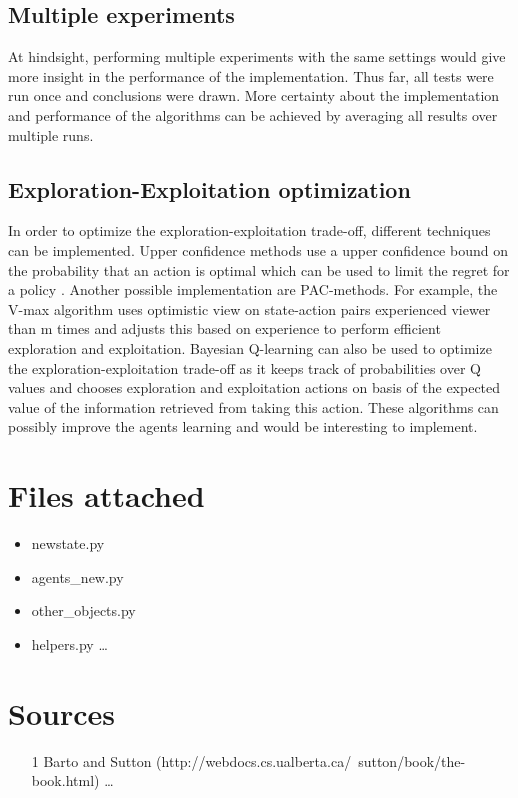 \documentclass{article}
\begin{document}
\subsection{Multiple experiments}
At hindsight, performing multiple experiments with the same settings would give more insight in the performance of the implementation. Thus far, all tests were run once and conclusions were drawn. More certainty about the implementation and performance of the algorithms can be achieved by averaging all results over multiple runs.

\subsection{Exploration-Exploitation optimization}
In order to optimize the exploration-exploitation trade-off, different techniques can be implemented. Upper confidence methods use a upper confidence bound on the probability that an action is optimal which can be used to limit the regret for a policy \cite{auer2009near}. Another possible implementation are PAC-methods. For example, the V-max\cite{rao:aamas12} algorithm uses optimistic view on state-action pairs experienced viewer than m times and adjusts this based on experience to perform efficient exploration and exploitation. Bayesian Q-learning \cite{dearden1998bayesian} can also be used to optimize the exploration-exploitation trade-off as it keeps track of probabilities over Q values and chooses exploration and exploitation actions on basis of the expected value of the information retrieved from taking this action.
These algorithms can possibly improve the agents learning and would be interesting to implement.
\pagebreak
\section{Files attached}
\begin{itemize}
\item newstate.py
\item agents\_new.py
\item other\_objects.py
\item helpers.py \ldots
\end{itemize}

\section{Sources}



\begin{itemize}
	\item [1] Barto and Sutton (http://webdocs.cs.ualberta.ca/~sutton/book/the-book.html) \ldots
\end{itemize}
\end{document}
